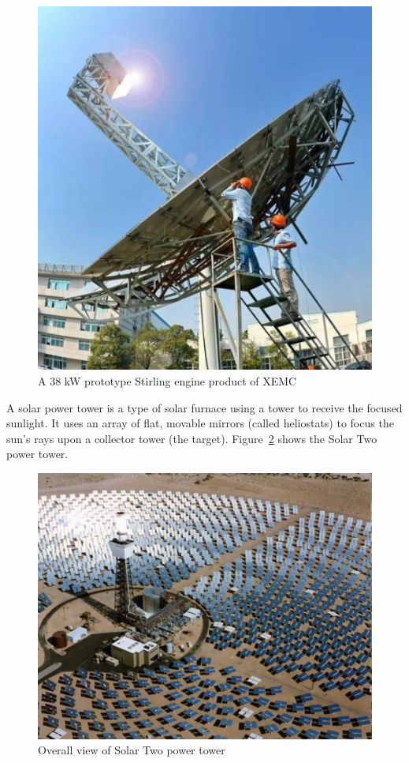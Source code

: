 \begin{figure}[!ht]
\centering
\includegraphics[width=.8\textwidth]{fig/ParabolicDish}
\caption{A 38 kW prototype Stirling engine product of XEMC}\label{fig:pd}
\end{figure}
A solar power tower is a type of solar furnace using a tower to receive the focused sunlight. It uses an array of flat, movable mirrors (called heliostats) to focus the sun's rays upon a collector tower (the target). Figure~\ref{fig:spt} shows the Solar Two power tower.
\begin{figure}[!ht]
\centering
\includegraphics[width=.8\textwidth]{fig/PowerTower}
\caption{Overall view of Solar Two power tower}\label{fig:spt}
\end{figure}

